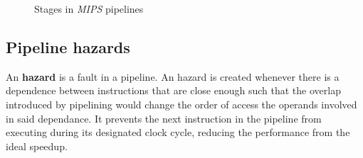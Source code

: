 \documentclass[english]{article}
\begin{document}
\begin{figure}[htbp]
  \bigskip
  \centering
  \caption{Stages in \textit{MIPS} pipelines}
  \label{fig:mips-pipeline-stages}
  \bigskip
\end{figure}

\subsection{Pipeline hazards}
\label{sec:pipeline-hazards}

An \textbf{hazard} is a fault in a pipeline.
An hazard is created whenever there is a dependence between instructions that are close enough such that the overlap introduced by pipelining would change the order of access the operands involved in said dependance.
It prevents the next instruction in the pipeline from executing during its designated clock cycle, reducing the performance from the ideal speedup.
\end{document}
